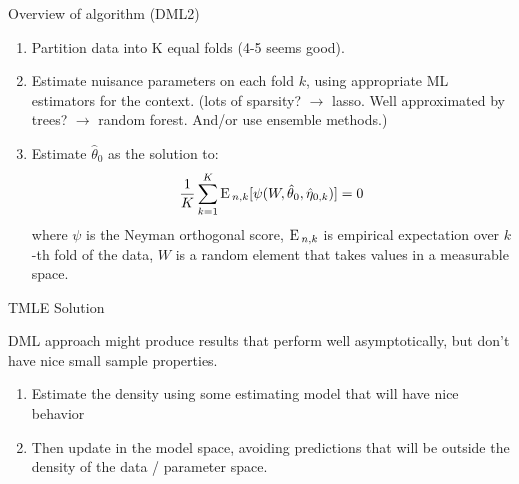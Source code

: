 \documentclass[xcolor={table}]{beamer}
\begin{document}
\note{
\scriptsize \singlespacing

}
\begin{frame}{Overview of algorithm (DML2)}

\begin{enumerate}
\item Partition data into K equal folds \pause(4-5 seems good). \pause 
\item  Estimate nuisance parameters on each fold $k$, using appropriate ML estimators for the context. \pause (lots of sparsity? $\rightarrow$ lasso. Well approximated by trees? $\rightarrow$ random forest. And/or use ensemble methods.) \pause 
\item Estimate $\hat \theta_0$ as the solution to:
\[
\frac 1 K \sum_{k = 1}^K {\textrm E}\,_{n, k} [\psi(W, \hat \theta_0, \hat \eta_{0,k})] = 0
\]
where $\psi$ is the Neyman orthogonal score, ${\textrm E}\,_{n, k}$ is empirical expectation over $k$-th fold of the data, $W$ is a random element that takes values in a measurable space. 

\end{enumerate}

\end{frame}


\note{
\scriptsize \singlespacing

}
\begin{frame}{TMLE Solution}

DML approach might produce results that perform well asymptotically, but don't have nice small sample properties. \pause

\begin{enumerate}
\item Estimate the density using some estimating model that will have nice behavior \pause 
\item Then update in the model space, avoiding predictions that will be outside the density of the data / parameter space. 
\end{enumerate}

\end{frame}
\end{document}
